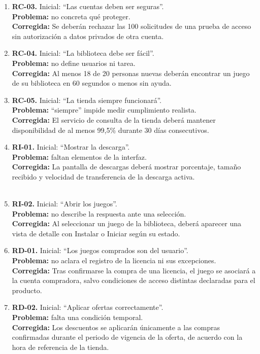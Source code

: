\documentclass[12pt,a4paper]{article}
\begin{document}
\begin{enumerate}[leftmargin=*,itemsep=8pt]
\item \textbf{RC-03.} Inicial: ``Las cuentas deben ser seguras''. \\\textbf{Problema:} no concreta qué proteger. \\\textbf{Corregida:} Se deberán rechazar las 100 solicitudes de una prueba de acceso sin autorización a datos privados de otra cuenta.
\item \textbf{RC-04.} Inicial: ``La biblioteca debe ser fácil''. \\\textbf{Problema:} no define usuarios ni tarea. \\\textbf{Corregida:} Al menos 18 de 20 personas nuevas deberán encontrar un juego de su biblioteca en 60 segundos o menos sin ayuda.
\item \textbf{RC-05.} Inicial: ``La tienda siempre funcionará''. \\\textbf{Problema:} ``siempre'' impide medir cumplimiento realista.\\ \textbf{Corregida:} El servicio de consulta de la tienda deberá mantener disponibilidad de al menos 99,5\% durante 30 días consecutivos.
\item \textbf{RI-01.} Inicial: ``Mostrar la descarga''.\\ \textbf{Problema:} faltan elementos de la interfaz. \\\textbf{Corregida:} La pantalla de descargas deberá mostrar porcentaje, tamaño recibido y velocidad de transferencia de la descarga activa.
\\\\
\item \textbf{RI-02.} Inicial: ``Abrir los juegos''. \\\textbf{Problema:} no describe la respuesta ante una selección. \\\textbf{Corregida:} Al seleccionar un juego de la biblioteca, deberá aparecer una vista de detalle con Instalar o Iniciar según su estado.
\item \textbf{RD-01.} Inicial: ``Los juegos comprados son del usuario''. \\\textbf{Problema:} no aclara el registro de la licencia ni sus excepciones. \\\textbf{Corregida:} Tras confirmarse la compra de una licencia, el juego se asociará a la cuenta compradora, salvo condiciones de acceso distintas declaradas para el producto.
\item \textbf{RD-02.} Inicial: ``Aplicar ofertas correctamente''.\\ \textbf{Problema:} falta una condición temporal. \\\textbf{Corregida:} Los descuentos se aplicarán únicamente a las compras confirmadas durante el periodo de vigencia de la oferta, de acuerdo con la hora de referencia de la tienda.

\end{enumerate}
\end{document}

